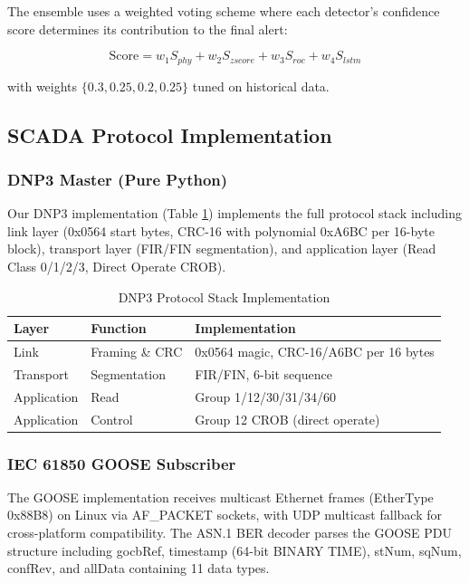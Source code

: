 \documentclass[conference]{IEEEtran}
\begin{document}
The ensemble uses a weighted voting scheme where each detector's confidence score determines its contribution to the final alert:

\begin{equation}
\text{Score} = w_1 S_{phy} + w_2 S_{zscore} + w_3 S_{roc} + w_4 S_{lstm}
\end{equation}

with weights $\{0.3, 0.25, 0.2, 0.25\}$ tuned on historical data.

\subsection{SCADA Protocol Implementation}

\subsubsection{DNP3 Master (Pure Python)}

Our DNP3 implementation (Table \ref{tab:dnp3}) implements the full protocol stack including link layer (0x0564 start bytes, CRC-16 with polynomial 0xA6BC per 16-byte block), transport layer (FIR/FIN segmentation), and application layer (Read Class 0/1/2/3, Direct Operate CROB).

\begin{table}[h]
\centering
\caption{DNP3 Protocol Stack Implementation}
\label{tab:dnp3}
\begin{tabular}{@{}lll@{}}
\toprule
\textbf{Layer} & \textbf{Function} & \textbf{Implementation} \\
\midrule
Link & Framing \& CRC & 0x0564 magic, CRC-16/A6BC per 16 bytes \\
Transport & Segmentation & FIR/FIN, 6-bit sequence \\
Application & Read & Group 1/12/30/31/34/60 \\
Application & Control & Group 12 CROB (direct operate) \\
\bottomrule
\end{tabular}
\end{table}

\subsubsection{IEC 61850 GOOSE Subscriber}

The GOOSE implementation receives multicast Ethernet frames (EtherType 0x88B8) on Linux via AF\_PACKET sockets, with UDP multicast fallback for cross-platform compatibility. The ASN.1 BER decoder parses the GOOSE PDU structure including gocbRef, timestamp (64-bit BINARY TIME), stNum, sqNum, confRev, and allData containing 11 data types.
\end{document}
